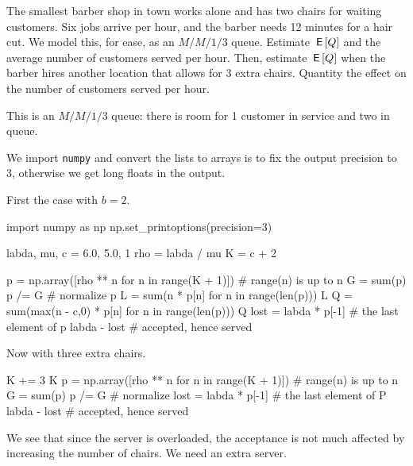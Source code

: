 \documentclass[stochastic-or.tex]{subfiles}
\begin{document}
\begin{exercise} The smallest barber shop in town works alone and has two chairs for waiting customers.
 Six jobs arrive per hour, and the barber needs 12 minutes for a hair cut. We model this, for ease, as an $M/M/1/3$ queue.
 Estimate $\,\mathsf{E}\left[Q\right]$ and the average number of customers served per hour.
 Then, estimate $\,\mathsf{E}\left[Q\right]$ when the barber hires another location that allows for 3 extra chairs.
 Quantity the effect on the number of customers served per hour.
\begin{solution}
This is an $M/M/1/3$ queue: there is room for 1 customer in service and two in queue.

We import \texttt{numpy} and convert the lists to arrays is to fix the output precision to 3, otherwise we get long floats in the output.

First the case with $b=2$.
\begin{pyconsole}[barber]
import numpy as np
np.set_printoptions(precision=3)

labda, mu, c = 6.0,  5.0, 1
rho = labda / mu
K = c + 2


p = np.array([rho ** n for n in range(K + 1)]) # range(n) is up to n
G = sum(p)
p /= G  # normalize
p
L = sum(n * p[n] for n in range(len(p)))
L
Q = sum(max(n - c,0) * p[n] for n in range(len(p)))
Q
lost = labda * p[-1]  # the last element of p
labda - lost # accepted, hence served
\end{pyconsole}

Now with three extra chairs.

\begin{pyconsole}[barber]
K += 3
K
p = np.array([rho ** n for n in range(K + 1)]) # range(n) is up to n
G = sum(p)
p /= G  # normalize
lost = labda * p[-1]  # the last element of P
labda - lost # accepted, hence served
\end{pyconsole}
We see that since the server is overloaded, the acceptance is not much affected by increasing the number of chairs.
We need an extra server.
\end{solution}
\end{exercise}
\end{document}
